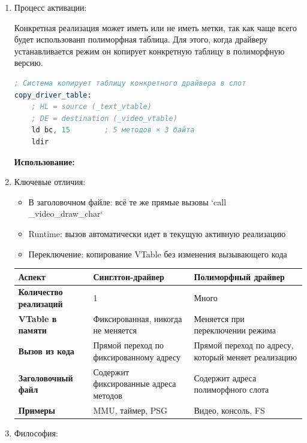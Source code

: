\documentclass[11pt,a4paper]{scrartcl}
\begin{document}
\begin{enumerate}
\begin{enumerate}
\begin{lstlisting}[language=asm,numbers=none]
_video_vtable:
_video_draw_char:    jp 0          ; Заполняется при активации
_video_set_mode:     jp 0          ; Заполняется при активации

; Конкретная реализация (например, текстовый режим)
PUBLIC _text_vtable
_text_vtable:
    jp text_draw_char_impl
    jp text_set_mode_impl
\end{lstlisting}
\item Процесс активации:
\label{sec:org5079a7e}

Конкретная реализация может иметь или не иметь метки, так как чаще всего будет использованп полиморфная таблица. Для этого, когда драйверу устанавливается режим он копирует конкретную таблицу в полиморфную версию.



\begin{lstlisting}[language=asm,numbers=none]
; Система копирует таблицу конкретного драйвера в слот
copy_driver_table:
    ; HL = source (_text_vtable)
    ; DE = destination (_video_vtable)
    ld bc, 15        ; 5 методов × 3 байта
    ldir
\end{lstlisting}

\textbf{Использование:}
\item Ключевые отличия:
\label{sec:orgc5faf6c}

\begin{itemize}
\item В заголовочном файле: всё те же прямые вызовы `call \_video\_draw\_char`
\item Runtime: вызов автоматически идет в текущую активную реализацию
\item Переключение: копирование VTable без изменения вызывающего кода
\end{itemize}

\begin{center}
\begin{tabularx}{\textwidth}{|X|X|X|}
Аспект & Синглтон-драйвер & Полиморфный драйвер\\
\hline
\textbf{Количество реализаций} & 1 & Много\\
\textbf{VTable в памяти} & Фиксированная, никогда не меняется & Меняется при переключении режима\\
\textbf{Вызов из кода} & Прямой переход по фиксированному адресу & Прямой переход по адресу, который меняет реализацию\\
\textbf{Заголовочный файл} & Содержит фиксированные адреса методов & Содержит адреса полиморфного слота\\
\textbf{Примеры} & MMU, таймер, PSG & Видео, консоль, FS\\
\end{tabularx}
\end{center}
\item Философия:
\label{sec:org8392665}


\end{enumerate}
\end{enumerate}
\end{document}

